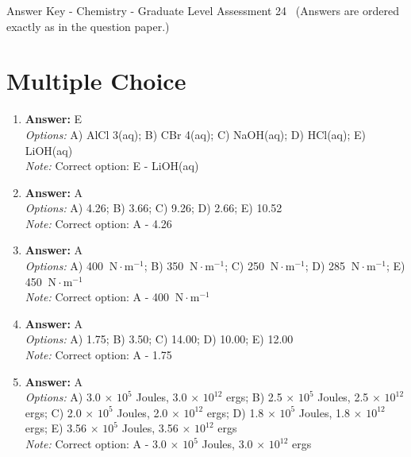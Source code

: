 \documentclass[12pt]{article}
\begin{document}
\begin{center}
Answer Key - Chemistry - Graduate Level Assessment 24 \
\small (Answers are ordered exactly as in the question paper.)
\end{center}

\section*{Multiple Choice}
\begin{enumerate}[label=\arabic*.]
\item \textbf{Answer:} E
\\ \textit{Options:} A) AlCl 3(aq); B) CBr 4(aq); C) NaOH(aq); D) HCl(aq); E) LiOH(aq)
\\ \textit{Note:} Correct option: E - LiOH(aq)
\item \textbf{Answer:} A
\\ \textit{Options:} A) 4.26; B) 3.66; C) 9.26; D) 2.66; E) 10.52
\\ \textit{Note:} Correct option: A - 4.26
\item \textbf{Answer:} A
\\ \textit{Options:} A) 400 $ \mathrm{~N} \cdot \mathrm{m}^{-1}$; B) 350 $ \mathrm{~N} \cdot \mathrm{m}^{-1}$; C) 250 $ \mathrm{~N} \cdot \mathrm{m}^{-1}$; D) 285 $\mathrm{~N} \cdot \mathrm{m}^{-1}$; E) 450 $\mathrm{~N} \cdot \mathrm{m}^{-1}$
\\ \textit{Note:} Correct option: A - 400 $ \mathrm{~N} \cdot \mathrm{m}^{-1}$
\item \textbf{Answer:} A
\\ \textit{Options:} A) 1.75; B) 3.50; C) 14.00; D) 10.00; E) 12.00
\\ \textit{Note:} Correct option: A - 1.75
\item \textbf{Answer:} A
\\ \textit{Options:} A) 3.0 \ensuremath{\times} $10^5$ Joules, 3.0 \ensuremath{\times} $10^12$ ergs; B) 2.5 \ensuremath{\times} $10^5$ Joules, 2.5 \ensuremath{\times} $10^12$ ergs; C) 2.0 \ensuremath{\times} $10^5$ Joules, 2.0 \ensuremath{\times} $10^12$ ergs; D) 1.8 \ensuremath{\times} $10^5$ Joules, 1.8 \ensuremath{\times} $10^12$ ergs; E) 3.56 \ensuremath{\times} $10^5$ Joules, 3.56 \ensuremath{\times} $10^12$ ergs
\\ \textit{Note:} Correct option: A - 3.0 \ensuremath{\times} $10^5$ Joules, 3.0 \ensuremath{\times} $10^12$ ergs
\end{enumerate}
\end{document}

